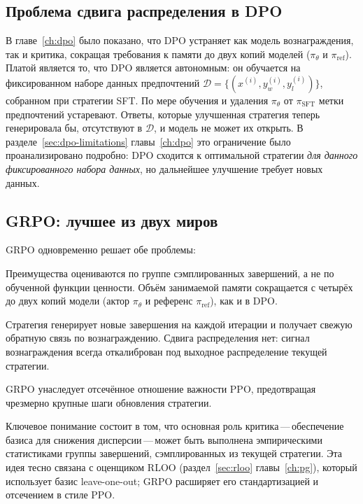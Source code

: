 \subsection{Проблема сдвига распределения в DPO}

В главе~\ref{ch:dpo} было показано, что DPO устраняет как модель вознаграждения, так и критика, сокращая требования к памяти до двух копий моделей ($\pi_\theta$ и $\pi_\mathrm{ref}$). Платой является то, что DPO является автономным: он обучается на фиксированном наборе данных предпочтений $\mathcal{D} = \{(x^{(i)}, y_w^{(i)}, y_l^{(i)})\}$, собранном при стратегии SFT. По мере обучения и удаления $\pi_\theta$ от $\pi_\mathrm{SFT}$ метки предпочтений устаревают. Ответы, которые улучшенная стратегия теперь генерировала бы, отсутствуют в $\mathcal{D}$, и модель не может их открыть. В разделе~\ref{sec:dpo-limitations} главы~\ref{ch:dpo} это ограничение было проанализировано подробно: DPO сходится к оптимальной стратегии \emph{для данного фиксированного набора данных}, но дальнейшее улучшение требует новых данных.

\subsection{GRPO: лучшее из двух миров}

GRPO одновременно решает обе проблемы:
\begin{description}[leftmargin=!,labelwidth=3.5cm]
  \item[Без критика] Преимущества оцениваются по группе сэмплированных завершений, а не по обученной функции ценности. Объём занимаемой памяти сокращается с четырёх до двух копий модели (актор $\pi_\theta$ и референс $\pi_\mathrm{ref}$), как и в DPO.
  \item[Онлайн-режим] Стратегия генерирует новые завершения на каждой итерации и получает свежую обратную связь по вознаграждению. Сдвига распределения нет: сигнал вознаграждения всегда откалиброван под выходное распределение текущей стратегии.
  \item[Стабильные обновления] GRPO унаследует отсечённое отношение важности PPO, предотвращая чрезмерно крупные шаги обновления стратегии.
\end{description}
Ключевое понимание состоит в том, что основная роль критика\,---\,обеспечение базиса для снижения дисперсии\,---\,может быть выполнена эмпирическими статистиками группы завершений, сэмплированных из текущей стратегии. Эта идея тесно связана с оценщиком RLOO (раздел~\ref{sec:rloo} главы~\ref{ch:pg}), который использует базис leave-one-out; GRPO расширяет его стандартизацией и отсечением в стиле PPO.

